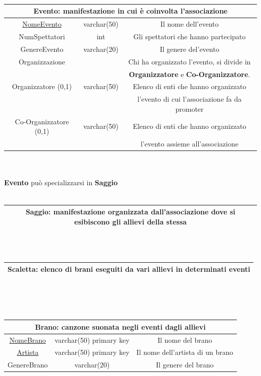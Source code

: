 \documentclass[11pt]{article}
\begin{document}
		\\\\\\
		\begin{tabular}{|c|c|c|}
			\hline
			\multicolumn{3}{|c|}{\textbf{Evento}: manifestazione in cui è coinvolta l'associazione}\\
			\hline
			\underline{NomeEvento} & varchar(50) & Il nome dell'evento\\
			\hline
			NumSpettatori & int & Gli spettatori che hanno partecipato\\
			\hline
			GenereEvento & varchar(20) & Il genere del'evento\\
			\hline
			Organizzazione &  & Chi ha organizzato l'evento, si divide in\\
			&  &\textbf{Organizzatore} e \textbf{Co-Organizzatore}.\\
			Organizzatore (0,1) & varchar(50) & Elenco di enti che hanno organizzato\\
			& & l'evento di cui l'associazione fa da promoter\\
			Co-Organizzatore (0,1) & varchar(50) & Elenco di enti che hanno organizzato \\
			& & l'evento assieme all'associazione\\
			\hline
		\end{tabular}
		\\\\
		\textbf{Evento} può specializzarsi in \textbf{Saggio}
		\\\\
		\begin{tabular}{|c|c|c|}
			\hline
			\multicolumn{3}{|c|}{\textbf{Saggio}: manifestazione organizzata dall'associazione dove si esibiscono gli allievi della stessa}\\
			\hline
		\end{tabular}
		\\\\
		\begin{tabular}{|c|c|c|}
			\hline
			\multicolumn{3}{|c|}{\textbf{Scaletta}: elenco di brani eseguiti da vari allievi in determinati eventi}\\
			\hline
		\end{tabular}
		\\\\\\
		\begin{tabular}{|c|c|c|}
			\hline
			\multicolumn{3}{|c|}{\textbf{Brano}: canzone suonata negli eventi dagli allievi}\\
			\hline
			\underline{NomeBrano} & varchar(50) primary key & Il nome del brano\\
			\hline
			\underline{Artista} & varchar(50) primary key & Il nome dell'artista di un brano\\
			\hline
			GenereBrano & varchar(20) & Il genere del brano\\
			\hline
		\end{tabular}
\end{document}
